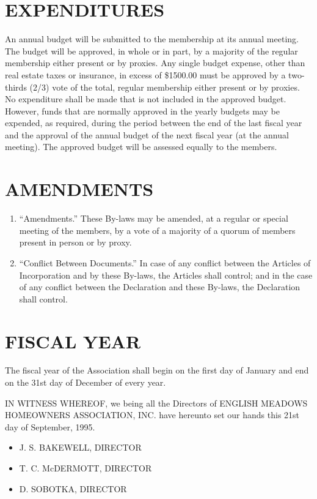\documentclass[10pt, letterpaper]{article}
\begin{document}
\section{EXPENDITURES}
An annual budget will be submitted to the membership at its annual meeting.
The budget will be approved, in whole or in part, by a majority of the regular membership either present or by proxies.
Any single budget expense, other than real estate taxes or insurance, in excess of \$1500.00 must be approved by a two-thirds (2/3) vote of the total, regular membership either present or by proxies.
No expenditure shall be made that is not included in the approved budget.
However, funds that are normally approved in the yearly budgets may be expended, as required, during the period between the end of the last fiscal year and the approval of the annual budget of the next fiscal year (at the annual meeting).
The approved budget will be assessed equally to the members.

\section{AMENDMENTS}
\begin{enumerate}
  \item ``Amendments.''
    These By-laws may be amended, at a regular or special meeting of the members, by a vote of a majority of a quorum of members present in person or by proxy.
  \item ``Conflict Between Documents.''
    In case of any conflict between the Articles of Incorporation and by these By-laws, the Articles shall control; and in the case of any conflict between the Declaration and these By-laws, the Declaration shall control.
\end{enumerate}

\section{FISCAL YEAR}
The fiscal year of the Association shall begin on the first day of January and end on the 31st day of December of every year.

IN WITNESS WHEREOF, we being all the Directors of ENGLISH MEADOWS HOMEOWNERS ASSOCIATION, INC. have hereunto set our hands this 21st day of September, 1995.
\begin{itemize}
  \item J. S. BAKEWELL, DIRECTOR
  \item T. C. McDERMOTT, DIRECTOR
  \item D. SOBOTKA, DIRECTOR
\end{itemize}
\end{document}
